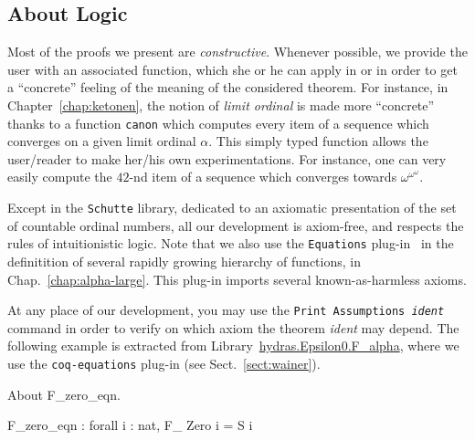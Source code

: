 \documentclass[a4paper]{book}
\begin{document}
\subsection{About Logic}

Most of the proofs we present are \emph{constructive}. Whenever possible, we provide the user with an associated function, which she or he can apply in \gallina{} or \ocaml{} in order to get a ``concrete'' feeling of the meaning of the considered theorem.
For instance, in Chapter~\vref{chap:ketonen}, the notion of \emph{limit ordinal} is
made more ``concrete'' thanks to a function \texttt{canon} which computes every item of a sequence which converges on a given limit ordinal $\alpha$. This simply typed function allows the user/reader to make her/his own experimentations.
For instance, one can very easily compute the $42$-nd item of a sequence which converges towards $\omega^{\omega^\omega}$.


 
Except in the \texttt{Schutte} library, dedicated to an axiomatic presentation of the set of countable ordinal numbers, all our development is axiom-free, and respects the rules of intuitionistic logic. Note that we also use the \texttt{Equations} plug-in~\cite{sozeau:hal-01671777} in the definitition of  several rapidly growing hierarchy of functions, in Chap.~\ref{chap:alpha-large}. This plug-in imports several known-as-harmless  axioms.



At any place of our development, you may use the  \texttt{Print Assumptions {\it ident}} command in order to verify on which axiom the theorem {\it ident} may depend. The following example is extracted from 
Library~\href{../src/html/hydras.Epsilon0.F_alpha.html}{hydras.Epsilon0.F\_alpha}, where we use the \texttt{coq-equations} plug-in (see Sect.~\vref{sect:wainer}).

\begin{Coqsrc}
About F_zero_eqn.
\end{Coqsrc}

\begin{Coqanswer}
F_zero_eqn : forall i : nat, F_ Zero i = S i
\end{Coqanswer}
\end{document}
